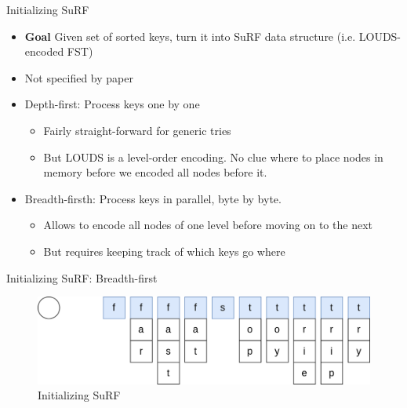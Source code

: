 \documentclass{beamer}
\begin{document}
\begin{frame}{Initializing SuRF}
		\begin{itemize}
				\item \textbf{Goal} Given set of sorted keys, turn it into SuRF
						data structure (i.e. LOUDS-encoded FST)
				\item Not specified by paper
				\item Depth-first: Process keys one by one
						\begin{itemize}
								\item Fairly straight-forward for generic tries
								\item But LOUDS is a level-order encoding. No
										clue where to place nodes in memory
										before we encoded all nodes before it.
						\end{itemize}

				\item Breadth-firsth: Process keys in parallel, byte by byte.
						\begin{itemize}
								\item Allows to encode all nodes of one level
										before moving on to the next
								\item But requires keeping track of which keys
										go where
						\end{itemize}
		\end{itemize}
\end{frame}

\begin{frame}{Initializing SuRF: Breadth-first}
		\begin{figure}
				\centering
				\includegraphics[width=\textwidth]{resources/initializing_surf_1}
				\caption{Initializing SuRF}
		\end{figure}
\end{frame}
\end{document}
